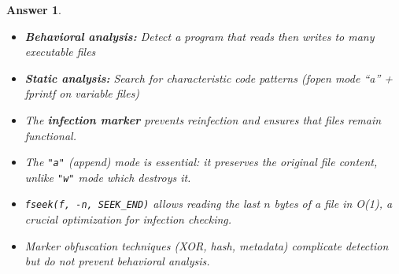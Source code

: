 \documentclass[a4paper,11pt]{article}
\theoremstyle{plain}
\newtheorem{correction}{Answer}
\theoremstyle{definition}
\begin{document}
\begin{correction}
\begin{enumerate}
\begin{itemize}
\item \textbf{Behavioral analysis:} Detect a program that reads then writes to many executable files

\item \textbf{Static analysis:} Search for characteristic code patterns (fopen mode ``a'' + fprintf on variable files)
\end{itemize}

\end{enumerate}

\begin{pointcle}
\begin{itemize}
    \item The \textbf{infection marker} prevents reinfection and ensures that files remain functional.
    \item The \texttt{"a"} (append) mode is essential: it preserves the original file content, unlike \texttt{"w"} mode which destroys it.
    \item \texttt{fseek(f, -n, SEEK\_END)} allows reading the last $n$ bytes of a file in O(1), a crucial optimization for infection checking.
    \item Marker obfuscation techniques (XOR, hash, metadata) complicate detection but do not prevent behavioral analysis.
\end{itemize}
\end{pointcle}

\end{correction}
\end{document}
